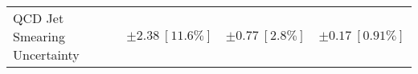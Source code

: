 \begin{table}
\begin{center}
\begin{tabular*}{\textwidth}{@{\extracolsep{\fill}}lccc}
QCD Jet Smearing Uncertainty        & $\pm 2.38\ [11.6\%] $          & $\pm 0.77\ [2.8\%] $          & $\pm 0.17\ [0.91\%] $       \\

\end{tabular*}
\end{center}
\end{table}
